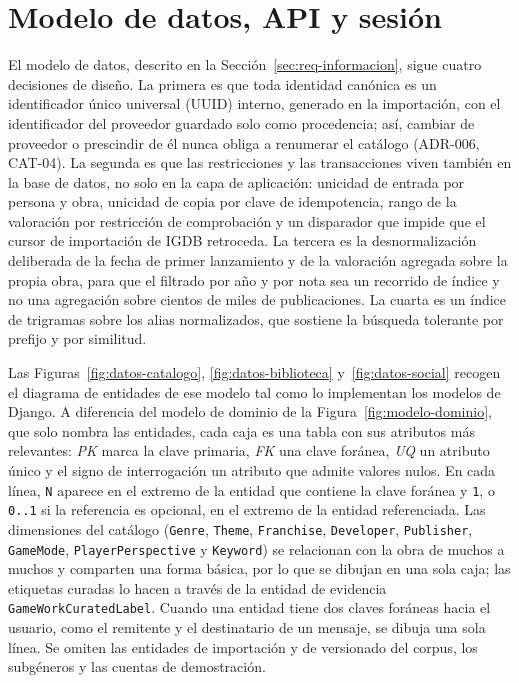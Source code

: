 \section{Modelo de datos, API y sesión}\label{sec:dis-modelo-datos}\label{sec:dis-api}\label{sec:dis-sesion}\label{sec:dis-frontera}

El modelo de datos, descrito en la Sección~\ref{sec:req-informacion}, sigue cuatro decisiones
de diseño. La primera es que toda identidad canónica es un identificador único universal
(UUID) interno, generado en la importación, con el identificador del proveedor guardado solo
como procedencia; así, cambiar de proveedor o prescindir de él nunca obliga a renumerar el
catálogo (ADR-006, CAT-04). La segunda es que las restricciones y las transacciones viven
también en la base de datos, no solo en la capa de aplicación: unicidad de entrada por
persona y obra, unicidad de copia por clave de idempotencia, rango de la valoración por
restricción de comprobación y un disparador que impide que el cursor de importación de IGDB
retroceda. La tercera es la desnormalización deliberada de la fecha de primer lanzamiento y
de la valoración agregada sobre la propia obra, para que el filtrado por año y por nota sea
un recorrido de índice y no una agregación sobre cientos de miles de publicaciones. La cuarta
es un índice de trigramas sobre los alias normalizados, que sostiene la búsqueda tolerante
por prefijo y por similitud.

Las Figuras~\ref{fig:datos-catalogo}, \ref{fig:datos-biblioteca} y~\ref{fig:datos-social}
recogen el diagrama de entidades de ese modelo tal como lo implementan los modelos de Django.
A diferencia del modelo de dominio de la Figura~\ref{fig:modelo-dominio}, que solo nombra las
entidades, cada caja es una tabla con sus atributos más relevantes: \textit{PK} marca la clave
primaria, \textit{FK} una clave foránea, \textit{UQ} un atributo único y el signo de
interrogación un atributo que admite valores nulos. En cada línea, \texttt{N} aparece en el
extremo de la entidad que contiene la clave foránea y \texttt{1}, o \texttt{0..1} si la
referencia es opcional, en el extremo de la entidad referenciada. Las dimensiones del catálogo
(\texttt{Genre}, \texttt{Theme}, \texttt{Franchise}, \texttt{Developer}, \texttt{Publisher},
\texttt{GameMode}, \texttt{PlayerPerspective} y \texttt{Keyword}) se relacionan con la obra de
muchos a muchos y comparten una forma básica, por lo que se dibujan en una sola caja; las
etiquetas curadas lo hacen a través de la entidad de evidencia \texttt{GameWorkCuratedLabel}.
Cuando una entidad tiene dos claves foráneas hacia el usuario, como el remitente y el
destinatario de un mensaje, se dibuja una sola línea. Se omiten las entidades de importación y
de versionado del corpus, los subgéneros y las cuentas de demostración.

